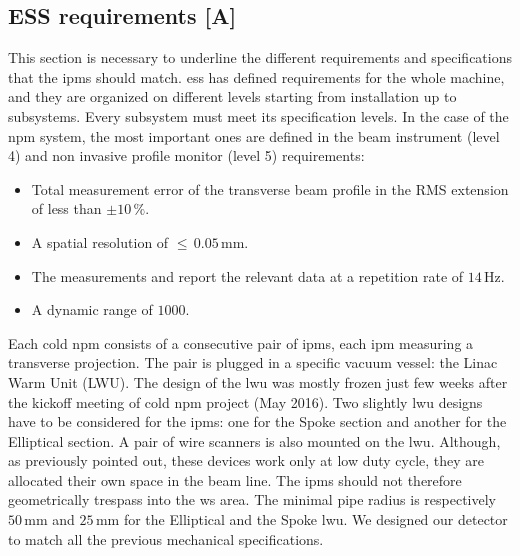 \begin{refsection}
  \section{ESS requirements [A]}
  This section is necessary to underline the different requirements and specifications that the \acrshort{ipm}s should match. \acrshort{ess} has defined requirements for the whole machine, and they are organized on different levels starting from installation up to subsystems. Every subsystem must meet its specification levels. In the case of the \acrshort{npm} system, the most important ones are defined in the beam instrument (level 4) and non invasive profile monitor (level 5) requirements:
  \begin{itemize}
    \item Total measurement error of the transverse beam profile in the RMS extension of less than $\pm10\,\%$.
    \item A spatial resolution of \(\leq\,0.05\,\mathrm{mm}\).
    \item The measurements and report the relevant data at a repetition rate of \(14\,\mathrm{Hz}\).
    \item A dynamic range of $1000$.
  \end{itemize}

  Each cold \acrshort{npm} consists of a consecutive pair of \acrshort{ipm}s, each \acrshort{ipm} measuring a transverse projection. The pair is plugged in a specific vacuum vessel: the Linac Warm Unit (LWU). The design of the \acrshort{lwu} was mostly frozen just few weeks after the kickoff meeting of cold \acrshort{npm} project (May 2016). Two slightly \acrshort{lwu} designs have to be considered for the \acrshort{ipm}s: one for the Spoke section and another for the Elliptical section. A pair of wire scanners is also mounted on the \acrshort{lwu}. Although, as previously pointed out, these devices work only at low duty cycle, they are allocated their own space in the beam line. The \acrshort{ipm}s should not therefore geometrically trespass into the \acrshort{ws} area. The minimal pipe radius is respectively \(50\,\mathrm{mm}\) and \(25\,\mathrm{mm}\) for the Elliptical and the Spoke \acrshort{lwu}. We designed our detector to match all the previous mechanical specifications.

  


\end{refsection}

